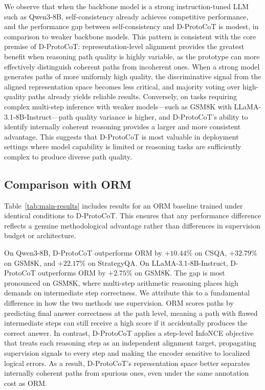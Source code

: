 \documentclass[a4paper,fleqn]{cas-dc}
\begin{document}
We observe that when the backbone model is a strong instruction-tuned LLM such as Qwen3-8B, self-consistency already achieves competitive performance, and the performance gap between self-consistency and D-ProtoCoT is modest, in comparison to weaker backbone models.
This pattern is consistent with the core premise of D-ProtoCoT: representation-level alignment provides the greatest benefit when reasoning path quality is highly variable, as the prototype can more effectively distinguish coherent paths from incoherent ones.
When a strong model generates paths of more uniformly high quality, the discriminative signal from the aligned representation space becomes less critical, and majority voting over high-quality paths already yields reliable results.
Conversely, on tasks requiring complex multi-step inference with weaker models---such as GSM8K with LLaMA-3.1-8B-Instruct---path quality variance is higher, and D-ProtoCoT's ability to identify internally coherent reasoning provides a larger and more consistent advantage.
This suggests that D-ProtoCoT is most valuable in deployment settings where model capability is limited or reasoning tasks are sufficiently complex to produce diverse path quality.

\subsection{Comparison with ORM}

Table~\ref{tab:main-results} includes results for an ORM baseline trained under identical conditions to D-ProtoCoT.
This ensures that any performance difference reflects a genuine methodological advantage rather than differences in supervision budget or architecture.

On Qwen3-8B, D-ProtoCoT outperforms ORM by $+10.44\%$ on CSQA, $+32.79\%$ on GSM8K, and $+22.17\%$ on StrategyQA.
On LLaMA-3.1-8B-Instruct, D-ProtoCoT outperforms ORM by $+2.75\%$ on GSM8K.
The gap is most pronounced on GSM8K, where multi-step arithmetic reasoning places high demands on intermediate step correctness.
We attribute this to a fundamental difference in how the two methods use supervision.
ORM scores paths by predicting final answer correctness at the path level, meaning a path with flawed intermediate steps can still receive a high score if it accidentally produces the correct answer.
In contrast, D-ProtoCoT applies a step-level InfoNCE objective that treats each reasoning step as an independent alignment target, propagating supervision signals to every step and making the encoder sensitive to localized logical errors.
As a result, D-ProtoCoT's representation space better separates internally coherent paths from spurious ones, even under the same annotation cost as ORM.
\end{document}
